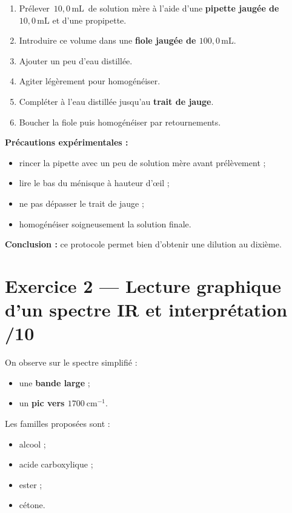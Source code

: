 \documentclass[11pt,a4paper]{article}
\begin{document}
\begin{enumerate}[label=\arabic*.]
    \item Prélever \(\,10{,}0\,\mathrm{mL}\,\) de solution mère à l'aide d'une \textbf{pipette jaugée de \(10{,}0\,\mathrm{mL}\)} et d'une propipette.
    \item Introduire ce volume dans une \textbf{fiole jaugée de \(100{,}0\,\mathrm{mL}\)}.
    \item Ajouter un peu d'eau distillée.
    \item Agiter légèrement pour homogénéiser.
    \item Compléter à l'eau distillée jusqu'au \textbf{trait de jauge}.
    \item Boucher la fiole puis homogénéiser par retournements.
\end{enumerate}

\textbf{Précautions expérimentales :}
\begin{itemize}
    \item rincer la pipette avec un peu de solution mère avant prélèvement ;
    \item lire le bas du ménisque à hauteur d'œil ;
    \item ne pas dépasser le trait de jauge ;
    \item homogénéiser soigneusement la solution finale.
\end{itemize}

\textbf{Conclusion :} ce protocole permet bien d'obtenir une dilution au dixième.

\newpage
\section*{Exercice 2 --- Lecture graphique d'un spectre IR et interprétation \hfill /10}

On observe sur le spectre simplifié :
\begin{itemize}
    \item une \textbf{bande large} ;
    \item un \textbf{pic vers \(1700\ \mathrm{cm}^{-1}\)}.
\end{itemize}

Les familles proposées sont :
\begin{itemize}
    \item alcool ;
    \item acide carboxylique ;
    \item ester ;
    \item cétone.
\end{itemize}
\end{document}
